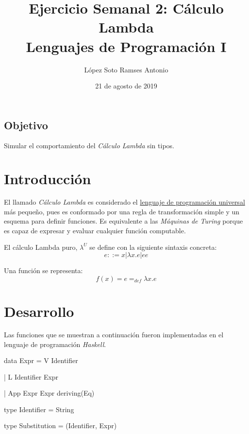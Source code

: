 \documentclass[12pt, letterpaper]{article}
\author{López Soto Ramses Antonio}
\title{Ejercicio Semanal 2: Cálculo Lambda \\
       {\small Lenguajes de Programación I}}
\date{21 de agosto de 2019}
\begin{document}
    \maketitle

    \subsection*{Objetivo}
    Simular el comportamiento del \textit{Cálculo Lambda} sin tipos.

    \section*{Introducción}
    El llamado \textit{Cálculo Lambda} es considerado el \underline{lenguaje de 
    programación universal} más pequeño, pues es conformado por una regla de
    transformación simple y un esquema para definir funciones. Es 
    equivalente a las \textit{Máquinas de Turing} porque es capaz de expresar y
    evaluar cualquier función computable. \vspace{.3cm}

    El cálculo Lambda puro, $\lambda ^U$ se define con la siguiente sintaxis 
    concreta: $$e::= x | \lambda x.e | ee$$ \vspace{.3cm}

    Una función se representa: $$f(x)= e =_{def} \lambda x.e$$\vspace{.3cm}

    \section*{Desarrollo}
    Las funciones que se muestran a continuación fueron implementadas en el
    lenguaje de programación \textit{Haskell}.

    \hspace{3cm} data Expr = V Identifier \vspace{.1cm}

    \hspace{4.5cm} | L Identifier Expr \vspace{.1cm}

    \hspace{4.5cm} | App Expr Expr deriving(Eq) \vspace{.3cm}

    \hspace{1cm} type Identifier = String\vspace{.3cm}

    \hspace{1cm} type Substitution = (Identifier, Expr) \vspace{.3cm}
\end{document}
